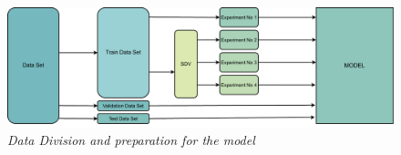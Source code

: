 \begin{figure}[hbt!]
    \centering
    \includegraphics[width=\linewidth]{images/SDV.pdf}
    \caption{\textit{Data Division and preparation for the model}}
    \label{fig:figure4}
    \vspace{-10pt}
\end{figure}